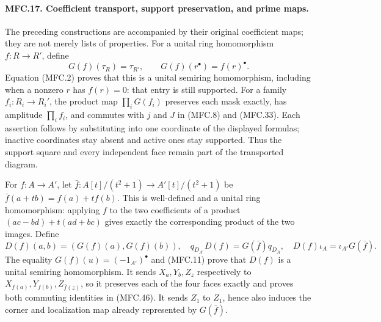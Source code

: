 \paragraph{MFC.17. Coefficient transport, support preservation, and prime maps.}
The preceding constructions are accompanied by their original
coefficient maps; they are not merely lists of properties.
For a unital ring homomorphism \(f:R\to R'\), define
\[
 G(f)(\tau_R)=\tau_{R'},\qquad
 G(f)(r^\bullet)=f(r)^\bullet.                             \tag{MFC.45}
\]
Equation (MFC.2) proves that this is a unital semiring
homomorphism, including when a nonzero \(r\) has
\(f(r)=0\): that entry is still supported.
For a family \(f_i:R_i\to R_i'\), the product map
\(\prod_iG(f_i)\) preserves each mask exactly, has
amplitude \(\prod_i f_i\), and commutes with \(j\)
and \(J\) in (MFC.8) and (MFC.33).
Each assertion follows by substituting into one
coordinate of the displayed formulas; inactive
coordinates stay absent and active ones stay supported.
Thus the support square and every independent face
remain part of the transported diagram.

For \(f:A\to A'\), let
\(\bar f:A[t]/(t^2+1)\to A'[t]/(t^2+1)\) be
\(\bar f(a+tb)=f(a)+tf(b)\). This is well-defined
and a unital ring homomorphism: applying \(f\) to
the two coefficients of a product
\((ac-bd)+t(ad+bc)\) gives exactly the corresponding
product of the two images. Define
\[
 D(f)(a,b)=(G(f)(a),G(f)(b)),\quad
 q_{D_{A'}}D(f)=G(\bar f)q_{D_A},\quad
 D(f)\iota_A=\iota_{A'}G(\bar f).                          \tag{MFC.46}
\]
The equality \(G(f)(u)=(-1_{A'})^\bullet\) and
(MFC.11) prove that \(D(f)\) is a unital semiring
homomorphism. It sends \(X_a,Y_b,Z_z\) respectively
to \(X_{f(a)},Y_{f(b)},Z_{\bar f(z)}\), so it
preserves each of the four faces exactly and proves
both commuting identities in (MFC.46). It sends
\(Z_1\) to \(Z_1\), hence also induces the corner
and localization map already represented by \(G(\bar f)\).

